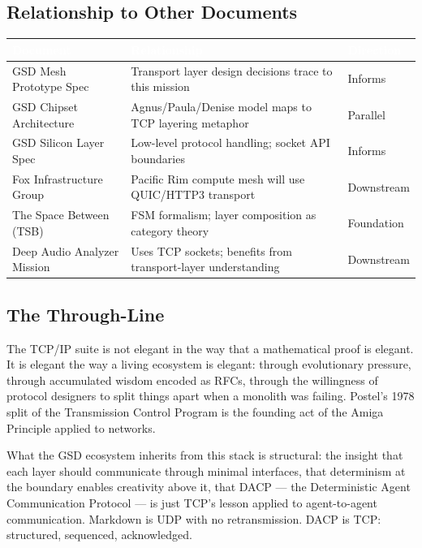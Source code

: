 \documentclass[11pt,letterpaper]{article}
\newcommand{\tableheader}[1]{\textbf{\sffamily\textcolor{white}{#1}}}
\begin{document}
\subsection{Relationship to Other Documents}

\begin{center}
\begin{tabularx}{\textwidth}{L{4cm}XL{3cm}}
\toprule
{}
\tableheader{Document} & \tableheader{Relationship} & \tableheader{Direction} \\
\midrule
GSD Mesh Prototype Spec & Transport layer design decisions trace to this mission & Informs \\
GSD Chipset Architecture & Agnus/Paula/Denise model maps to TCP layering metaphor & Parallel \\
GSD Silicon Layer Spec & Low-level protocol handling; socket API boundaries & Informs \\
Fox Infrastructure Group & Pacific Rim compute mesh will use QUIC/HTTP3 transport & Downstream \\
The Space Between (TSB) & FSM formalism; layer composition as category theory & Foundation \\
Deep Audio Analyzer Mission & Uses TCP sockets; benefits from transport-layer understanding & Downstream \\
\bottomrule
\end{tabularx}
\end{center}

\subsection{The Through-Line}

The TCP/IP suite is not elegant in the way that a mathematical proof is elegant. It is elegant the way a living ecosystem is elegant: through evolutionary pressure, through accumulated wisdom encoded as RFCs, through the willingness of protocol designers to split things apart when a monolith was failing. Postel's 1978 split of the Transmission Control Program is the founding act of the Amiga Principle applied to networks.

What the GSD ecosystem inherits from this stack is structural: the insight that each layer should communicate through minimal interfaces, that determinism at the boundary enables creativity above it, that DACP --- the Deterministic Agent Communication Protocol --- is just TCP's lesson applied to agent-to-agent communication. Markdown is UDP with no retransmission. DACP is TCP: structured, sequenced, acknowledged.
\end{document}
